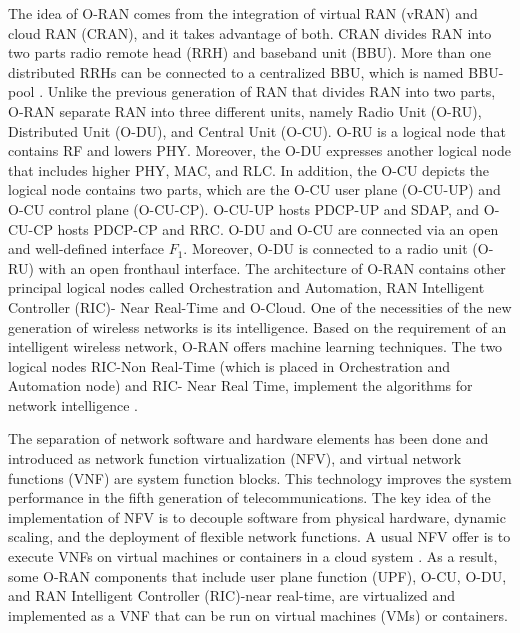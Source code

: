 \documentclass[conference]{IEEEtran}
\begin{document}
The idea of O-RAN comes from the integration of virtual RAN (vRAN) and cloud RAN (CRAN), and it takes advantage of both. CRAN divides RAN into two parts radio remote head (RRH) and baseband unit (BBU).  More than one distributed RRHs can be connected to a centralized BBU, which is named BBU-pool \cite{han2019research}. 
Unlike the previous generation of RAN that divides RAN into two parts, O-RAN separate RAN into three different units, namely Radio Unit (O-RU), Distributed Unit (O-DU), and Central Unit (O-CU). 
O-RU is a logical node that contains RF and lowers PHY. Moreover, the O-DU expresses another logical node that includes higher PHY, MAC, and RLC.
 In addition, the O-CU depicts the logical node contains two parts, which are the O-CU user plane (O-CU-UP) and O-CU control plane (O-CU-CP). O-CU-UP hosts PDCP-UP and SDAP, and O-CU-CP hosts PDCP-CP and RRC.
O-DU and O-CU are connected via an open and well-defined interface $F_1$.
Moreover, O-DU is connected to a radio unit (O-RU) with an open fronthaul interface.
The architecture of O-RAN contains other principal logical nodes called Orchestration and Automation,
RAN Intelligent Controller (RIC)- Near Real-Time and O-Cloud. 
One of the necessities of the new generation of wireless networks is its intelligence.
Based on the requirement of an intelligent wireless network, O-RAN offers machine learning techniques. The two logical nodes RIC-Non Real-Time (which is placed in Orchestration and Automation node) and RIC- Near Real Time, implement the algorithms for network intelligence 
\cite{gavrilovska2020cloud,niknam2020intelligent,kazemifard2021minimum,both2021system,ORANArch,ORANML,lin2021toward}.

The separation of network software and hardware elements has been done and introduced as network function virtualization (NFV), and virtual network functions (VNF) are system function blocks. This technology improves the system performance in the fifth generation of telecommunications. 
The key idea of the implementation of NFV is to decouple software from physical hardware, dynamic scaling, and the deployment of flexible network functions. A usual NFV offer is to execute VNFs on virtual machines or containers in a cloud system \cite{mijumbi2015network, luo2020online}.
As a result, some O-RAN components that include user plane function (UPF), O-CU, O-DU, and RAN Intelligent Controller (RIC)-near real-time, are virtualized and implemented as a VNF that can be run on virtual machines (VMs) or containers.
\end{document}
